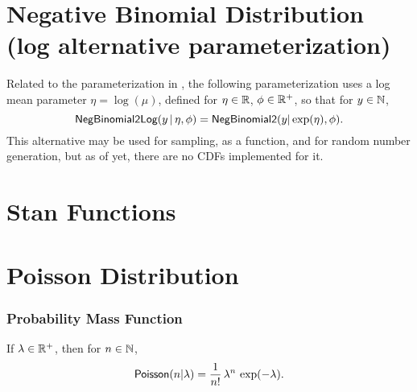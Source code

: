 \section{Negative Binomial Distribution (log alternative parameterization)}\label{neg-binom-2-log.section}

Related to the parameterization in , the following
parameterization uses a log mean parameter $\eta = \log(\mu)$, defined
for $\eta \in \mathbb{R}$, $\phi \in \mathbb{R}^+$, so that for $y \in \mathbb{N}$,
%
\[
\mbox{\sf NegBinomial2Log}(y \, | \, \eta, \phi)
=
\mbox{\sf NegBinomial2}(y | \exp(\eta), \phi).
\]
%
This alternative may be used for sampling, as a function, and for
random number generation, but as of yet, there are no CDFs implemented
for it.


\section{Stan Functions}

\begin{description}
%
%
%
\end{description}

\section{Poisson Distribution}\label{poisson.section}

\subsubsection{Probability Mass Function}

If $\lambda \in \mathbb{R}^+$, then for $n \in \mathbb{N}$,
\[
\mbox{\sf Poisson}(n|\lambda)
=
\frac{1}{n!}
\,
\lambda^n
\,
\exp(-\lambda).
\]


